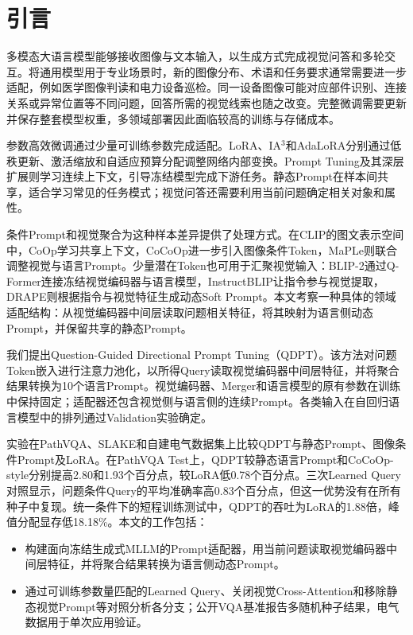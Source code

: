 \section{引言}

多模态大语言模型能够接收图像与文本输入，以生成方式完成视觉问答和多轮交互\cite{Alayrac2022FlamingoAV,li2023blip,Liu2023VisualIT,Zhu2023MiniGPT4EV,Bai2025Qwen3VLTR}。将通用模型用于专业场景时，新的图像分布、术语和任务要求通常需要进一步适配，例如医学图像判读和电力设备巡检\cite{He2020PathVQA3Q,Liu2021SlakeAS,Wang2024PowerLLaVALL}。同一设备图像可能对应部件识别、连接关系或异常位置等不同问题，回答所需的视觉线索也随之改变。完整微调需要更新并保存整套模型权重，多领域部署因此面临较高的训练与存储成本\cite{houlsby2019parameter,Hu2022LoRA}。

参数高效微调通过少量可训练参数完成适配。LoRA、IA$^3$和AdaLoRA分别通过低秩更新、激活缩放和自适应预算分配调整网络内部变换\cite{Hu2022LoRA,Liu2022FewShotPF,Zhang2023AdaLoRAAB}。Prompt Tuning及其深层扩展则学习连续上下文，引导冻结模型完成下游任务\cite{li2021prefix,lester2021power,Liu2021PTuningVP,jia2022visual}。静态Prompt在样本间共享，适合学习常见的任务模式；视觉问答还需要利用当前问题确定相关对象和属性\cite{dai2023instructblip}。

条件Prompt和视觉聚合为这种样本差异提供了处理方式。在CLIP的图文表示空间中，CoOp学习共享上下文，CoCoOp进一步引入图像条件Token，MaPLe则联合调整视觉与语言Prompt\cite{Radford2021LearningTV,Zhou2021LearningTP,Zhou2022ConditionalPL,Khattak2022MaPLeMP}。少量潜在Token也可用于汇聚视觉输入\cite{Jaegle2021PerceiverGP,Ryoo2021TokenLearnerWC}：BLIP-2通过Q-Former连接冻结视觉编码器与语言模型，InstructBLIP让指令参与视觉提取，DRAPE则根据指令与视觉特征生成动态Soft Prompt\cite{li2023blip,dai2023instructblip,Hu2026DynamicCP}。本文考察一种具体的领域适配结构：从视觉编码器中间层读取问题相关特征，将其映射为语言侧动态Prompt，并保留共享的静态Prompt。

我们提出Question-Guided Directional Prompt Tuning（QDPT）。该方法对问题Token嵌入进行注意力池化，以所得Query读取视觉编码器中间层特征，并将聚合结果转换为10个语言Prompt。视觉编码器、Merger和语言模型的原有参数在训练中保持固定；适配器还包含视觉侧与语言侧的连续Prompt。各类输入在自回归语言模型中的排列通过Validation实验确定。

实验在PathVQA、SLAKE和自建电气数据集上比较QDPT与静态Prompt、图像条件Prompt及LoRA。在PathVQA Test上，QDPT较静态语言Prompt和CoCoOp-style分别提高2.80和1.93个百分点，较LoRA低0.78个百分点。三次Learned Query对照显示，问题条件Query的平均准确率高0.83个百分点，但这一优势没有在所有种子中复现。统一条件下的短程训练测试中，QDPT的吞吐为LoRA的1.88倍，峰值分配显存低18.18\%。本文的工作包括：

\begin{itemize}
    \item 构建面向冻结生成式MLLM的Prompt适配器，用当前问题读取视觉编码器中间层特征，并将聚合结果转换为语言侧动态Prompt。
    \item 通过可训练参数量匹配的Learned Query、关闭视觉Cross-Attention和移除静态视觉Prompt等对照分析各分支；公开VQA基准报告多随机种子结果，电气数据用于单次应用验证。
\end{itemize}

